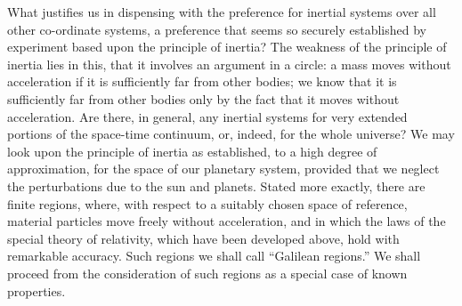 \documentclass[12pt]{book}[2005/09/16]
\newcommand{\PageSep}[1]{\ignorespaces}
\begin{document}
What justifies us in dispensing with the preference
for inertial systems over all other co-ordinate systems, a
preference that seems so securely established by experiment
\PageSep{65}
based upon the principle of inertia? The weakness
%
%
of the principle of inertia lies in this, that it involves an
argument in a circle: a mass moves without acceleration
if it is sufficiently far from other bodies; we know that
it is sufficiently far from other bodies only by the fact
that it moves without acceleration. Are there, in general,
any inertial systems for very extended portions of the
space-time continuum, or, indeed, for the whole universe?
We may look upon the principle of inertia as established,
to a high degree of approximation, for the space of our
planetary system, provided that we neglect the perturbations
due to the sun and planets. Stated more exactly,
there are finite regions, where, with respect to a suitably
chosen space of reference, material particles move freely
without acceleration, and in which the laws of the special
theory of relativity, which have been developed above,
hold with remarkable accuracy. Such regions we shall
call ``Galilean regions.'' We shall proceed from the
%
consideration of such regions as a special case of known
properties.
\end{document}
